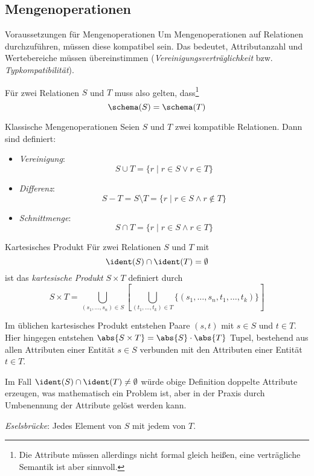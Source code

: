 \subsection{Mengenoperationen}

\begin{defi}{Voraussetzungen für Mengenoperationen}
    Um Mengenoperationen auf Relationen durchzuführen, müssen diese kompatibel sein.
    Das bedeutet, Attributanzahl und Wertebereiche müssen übereinstimmen (\emph{Vereinigungsverträglichkeit} bzw. \emph{Typkompatibilität}).

    Für zwei Relationen $S$ und $T$ muss also gelten, dass\footnote{Die Attribute müssen allerdings nicht formal gleich heißen, eine verträgliche Semantik ist aber sinnvoll.}
    \[
        \schema(S) = \schema(T)
    \]
\end{defi}

\begin{defi}{Klassische Mengenoperationen}
    Seien $S$ und $T$ zwei kompatible Relationen.
    Dann sind definiert:
    \begin{itemize}
        \item \emph{Vereinigung}:
              \[
                  S \cup T = \{ r \mid r \in S \lor r \in T \}
              \]
        \item \emph{Differenz}:
              \[
                  S - T = S \setminus T = \{ r \mid r \in S \land r \notin T \}
              \]
        \item \emph{Schnittmenge}:
              \[
                  S \cap T = \{ r \mid r \in S \land r \in T \}
              \]
    \end{itemize}

\end{defi}

\begin{defi}{Kartesisches Produkt}
    Für zwei Relationen $S$ und $T$ mit
    \[
        \ident(S) \cap \ident(T) = \emptyset
    \]
    ist das \emph{kartesische Produkt} $S \times T$ definiert durch
    \[
        S \times T = \bigcup_{(s_1, \ldots, s_n) \in S} \left[ \bigcup_{(t_1, \ldots, t_k) \in T} \{ (s_1, \ldots,  s_n, t_1, \ldots, t_k) \} \right]
    \]

    Im üblichen kartesisches Produkt entstehen Paare $(s,t)$ mit $s \in S$ und $t \in T$.
    Hier hingegen entstehen $\abs{S \times T} = \abs{S} \cdot \abs{T}$ Tupel, bestehend aus allen Attributen einer Entität $s \in S$ verbunden mit den Attributen einer Entität $t \in T$.

    Im Fall $\ident(S) \cap \ident(T) \neq \emptyset$ würde obige Definition doppelte Attribute erzeugen, was mathematisch ein Problem ist, aber in der Praxis durch Umbenennung der Attribute gelöst werden kann.

    \emph{Eselsbrücke}: Jedes Element von $S$ mit jedem von $T$.
\end{defi}

